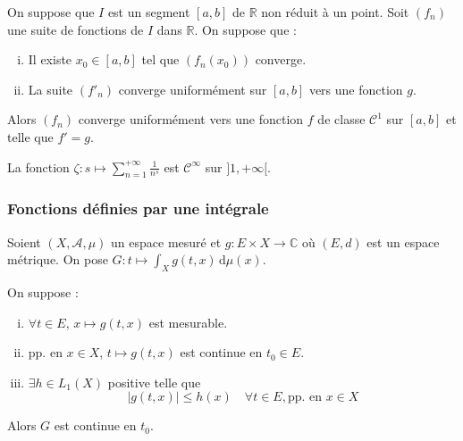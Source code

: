 	\begin{proposition}
		On suppose que $I$ est un segment $[a,b]$ de $\mathbb{R}$ non réduit à un point. Soit $(f_n)$ une suite de fonctions de $I$ dans $\mathbb{R}$. On suppose que :
		\begin{enumerate}[(i)]
			\item Il existe $x_0 \in [a,b]$ tel que $(f_n(x_0))$ converge.
			\item La suite $(f'_n)$ converge uniformément sur $[a,b]$ vers une fonction $g$.
		\end{enumerate}
		Alors $(f_n)$ converge uniformément vers une fonction $f$ de classe $\mathcal{C}^1$ sur $[a,b]$ et telle que $f'=g$.
	\end{proposition}


	\begin{example}
		La fonction $\zeta : s \mapsto \sum_{n=1}^{+\infty} \frac{1}{n^s}$ est $\mathcal{C}^\infty$ sur $]1,+\infty[$.
	\end{example}

	\subsubsection{Fonctions définies par une intégrale}


	Soient $(X, \mathcal{A}, \mu)$ un espace mesuré et $g : E \times X \rightarrow \mathbb{C}$ où $(E, d)$ est un espace métrique. On pose $G : t \mapsto \int_X g(t, x) \, \mathrm{d}\mu(x)$.

	\begin{theorem}
		On suppose :
		\begin{enumerate}[(i)]
			\item $\forall t \in E$, $x \mapsto g(t,x)$ est mesurable.
			\item pp. en $x \in X$, $t \mapsto g(t,x)$ est continue en $t_0 \in E$.
			\item $\exists h \in L_1(X)$ positive telle que
			\[ |g(t,x)| \leq h(x) \quad \forall t \in E, \text{pp. en } x \in X \]
		\end{enumerate}
		Alors $G$ est continue en $t_0$.
	\end{theorem}

